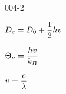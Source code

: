 \begin{mitframe}{004-2}

    
\begin{listone}
        
    \item $\eneatom=\mbde+\dfrac{1}{2}\planck\vvel$
        
    \item $\vibrfreqfac=\dfrac{\planck\vvel}{\boltz}$
         
    \item $\vvel=\dfrac{\lightspeed}{\wavel}$   
    
\end{listone}			

\end{mitframe}